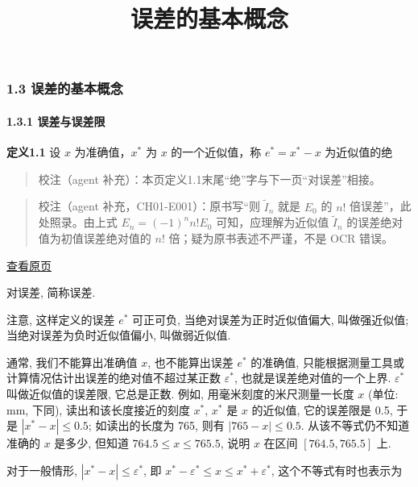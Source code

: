 \documentclass[
  10pt,
  fontset=fandol]{ctexart}
\title{误差的基本概念}
\author{}
\date{}
\begin{document}
\maketitle

\subsubsection{1.3 误差的基本概念}\label{ux8befux5deeux7684ux57faux672cux6982ux5ff5}

\paragraph{1.3.1 误差与误差限}\label{ux8befux5deeux4e0eux8befux5deeux9650}

\textbf{定义1.1} 设 \(x\) 为准确值，\(x^*\) 为 \(x\) 的一个近似值，称 \(e^* = x^* - x\) 为近似值的绝

\begin{quote}
校注（agent 补充）：本页定义1.1末尾``绝''字与下一页``对误差''相接。
\end{quote}

\begin{quote}
校注（agent 补充，CH01-E001）：原书写``则 \(\tilde{I}_n\) 就是 \(E_0\) 的 \(n!\) 倍误差''，此处照录。由上式 \(E_n=(-1)^n n!E_0\) 可知，应理解为近似值 \(\tilde{I}_n\) 的误差绝对值为初值误差绝对值的 \(n!\) 倍；疑为原书表述不严谨，不是 OCR 错误。
\end{quote}

\href{../../source-images/pdf-018.jpeg}{查看原页}

对误差, 简称误差.

注意, 这样定义的误差 \(e^*\) 可正可负, 当绝对误差为正时近似值偏大, 叫做强近似值; 当绝对误差为负时近似值偏小, 叫做弱近似值.

通常, 我们不能算出准确值 \(x\), 也不能算出误差 \(e^*\) 的准确值, 只能根据测量工具或计算情况估计出误差的绝对值不超过某正数 \(\varepsilon^*\), 也就是误差绝对值的一个上界. \(\varepsilon^*\) 叫做近似值的误差限, 它总是正数. 例如, 用毫米刻度的米尺测量一长度 \(x\) (单位: mm, 下同), 读出和该长度接近的刻度 \(x^*\), \(x^*\) 是 \(x\) 的近似值, 它的误差限是 0.5, 于是 \(|x^* - x| \leqslant 0.5\); 如读出的长度为 765, 则有 \(|765 - x| \leqslant 0.5\). 从该不等式仍不知道准确的 \(x\) 是多少, 但知道 \(764.5 \leqslant x \leqslant 765.5\), 说明 \(x\) 在区间 \([764.5, 765.5]\) 上.

对于一般情形, \(|x^* - x| \leqslant \varepsilon^*\), 即 \(x^* - \varepsilon^* \leqslant x \leqslant x^* + \varepsilon^*\), 这个不等式有时也表示为
\end{document}
